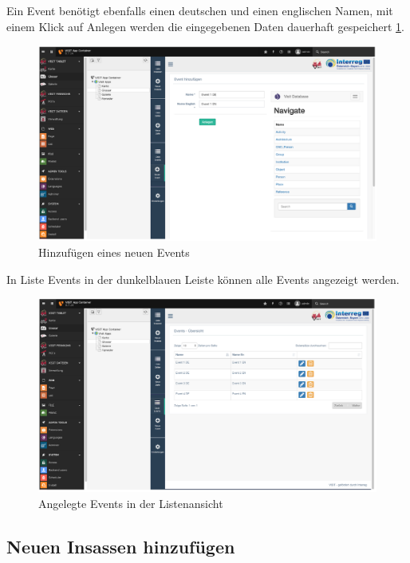 Ein Event benötigt ebenfalls einen deutschen und einen englischen Namen, mit einem Klick auf \glqq Anlegen\grqq{} werden die eingegebenen Daten dauerhaft gespeichert \ref{img:hinzufuegen_event}.
\begin{figure}[ht!]
\centering
\includegraphics[width=12cm]{Figures/paula/glossar/hinzufuegen_event.png}
\caption{Hinzufügen eines neuen Events}
\label{img:hinzufuegen_event}
\end{figure}

In \glqq Liste Events\grqq{} in der dunkelblauen Leiste können alle Events angezeigt werden.

\begin{figure}[ht!]
\centering
\includegraphics[width=12cm]{Figures/paula/glossar/angelegte_events_listenansicht.png}
\caption{Angelegte Events in der Listenansicht}
\label{img:angelegte_events_listenansicht}
\end{figure}

\subsection{Neuen Insassen hinzufügen}

